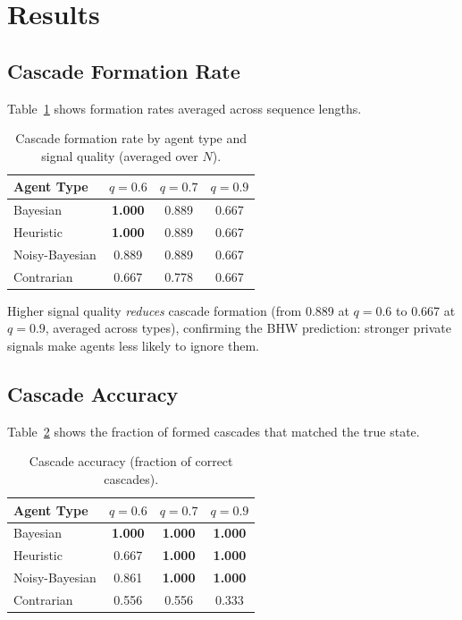 \documentclass[11pt]{article}
\begin{document}
\section{Results}

\subsection{Cascade Formation Rate}

Table~\ref{tab:formation} shows formation rates averaged across sequence lengths.

\begin{table}[h]
\centering
\caption{Cascade formation rate by agent type and signal quality (averaged over $N$).}
\label{tab:formation}
\begin{tabular}{lccc}
\toprule
\textbf{Agent Type} & $q=0.6$ & $q=0.7$ & $q=0.9$ \\
\midrule
Bayesian        & \textbf{1.000} & 0.889 & 0.667 \\
Heuristic       & \textbf{1.000} & 0.889 & 0.667 \\
Noisy-Bayesian  & 0.889 & 0.889 & 0.667 \\
Contrarian      & 0.667 & 0.778 & 0.667 \\
\bottomrule
\end{tabular}
\end{table}

Higher signal quality \emph{reduces} cascade formation (from 0.889 at $q{=}0.6$ to 0.667 at $q{=}0.9$, averaged across types), confirming the BHW prediction: stronger private signals make agents less likely to ignore them.

\subsection{Cascade Accuracy}

Table~\ref{tab:accuracy} shows the fraction of formed cascades that matched the true state.

\begin{table}[h]
\centering
\caption{Cascade accuracy (fraction of correct cascades).}
\label{tab:accuracy}
\begin{tabular}{lccc}
\toprule
\textbf{Agent Type} & $q=0.6$ & $q=0.7$ & $q=0.9$ \\
\midrule
Bayesian        & \textbf{1.000} & \textbf{1.000} & \textbf{1.000} \\
Heuristic       & 0.667 & \textbf{1.000} & \textbf{1.000} \\
Noisy-Bayesian  & 0.861 & \textbf{1.000} & \textbf{1.000} \\
Contrarian      & 0.556 & 0.556 & 0.333 \\
\bottomrule
\end{tabular}
\end{table}
\end{document}
